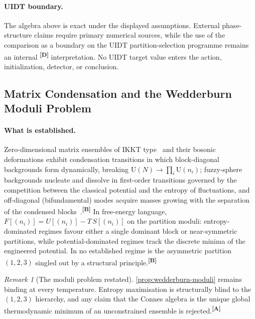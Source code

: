 \documentclass[12pt,a4paper,twoside]{article}
\theoremstyle{plain}
\theoremstyle{definition}
\theoremstyle{remark}
\newtheorem{remark}[theorem]{Remark}
\newcommand{\catmark}[1]{\textsuperscript{\textsf{\textbf{[#1]}}}}
\begin{document}
\paragraph{UIDT boundary.}
The algebra above is exact under the displayed assumptions. External
phase-structure claims require primary numerical sources, while the use
of the comparison as a boundary on the UIDT partition-selection
programme remains an internal \catmark{D} interpretation. No UIDT target
value enters the action, initialization, detector, or conclusion.

\subsection{Matrix Condensation and the Wedderburn Moduli Problem}
\label{subsec:attractor-condensation}

\paragraph{What is established.}
Zero-dimensional matrix ensembles of IKKT type~\cite{ikkt1997} and their
bosonic deformations exhibit condensation transitions in which
block-diagonal backgrounds form dynamically, breaking
$\mathrm{U}(N)\to\prod_i\mathrm{U}(n_i)$; fuzzy-sphere backgrounds
nucleate and dissolve in first-order transitions governed by the
competition between the classical potential and the entropy of
fluctuations, and off-diagonal (bifundamental) modes acquire masses
growing with the separation of the condensed
blocks~\cite{azuma2004,grosse2005,steinacker2010}.\catmark{B} In
free-energy language, $F[(n_i)] = U[(n_i)] - T\,S[(n_i)]$ on the
partition moduli: entropy-dominated regimes favour either a single
dominant block or near-symmetric partitions, while potential-dominated
regimes track the discrete minima of the engineered potential. In no
established regime is the asymmetric partition $(1,2,3)$ singled out by a
structural principle.\catmark{B}

\begin{remark}[The moduli problem restated]
\label{rem:moduli-restated}
\cref{prop:wedderburn-moduli} remains binding at every temperature.
Entropy maximisation is structurally blind to the $(1,2,3)$ hierarchy,
and any claim that the Connes algebra is the unique global thermodynamic
minimum of an unconstrained ensemble is rejected.\catmark{A}
\end{remark}
\end{document}
